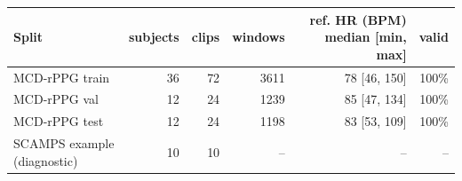 \begin{tabular}{lrrrrr}\toprule
Split & subjects & clips & windows & ref. HR (BPM) median [min, max] & valid \\\midrule
MCD-rPPG train & 36 & 72 & 3611 & 78 [46, 150] & 100\% \\
MCD-rPPG val & 12 & 24 & 1239 & 85 [47, 134] & 100\% \\
MCD-rPPG test & 12 & 24 & 1198 & 83 [53, 109] & 100\% \\
SCAMPS example (diagnostic) & 10 & 10 & -- & -- & -- \\
\bottomrule\end{tabular}
